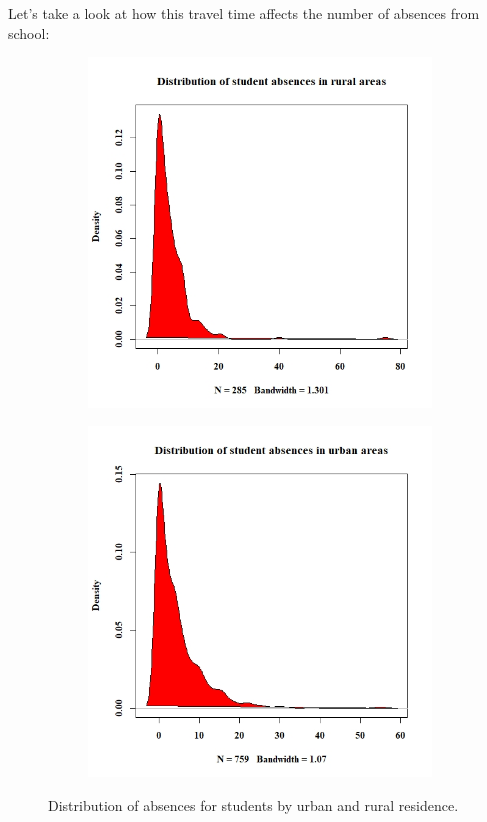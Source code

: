 \documentclass[a4paper, 11pt]{article}
\begin{document}
	Let's take a look at how this travel time affects the number of absences from school:
	\begin{figure}[H]
		\centering
		\begin{subfigure}[b]{0.4\linewidth}
			\includegraphics[width=\linewidth]{abs_rur.jpeg}
		\end{subfigure}
		\begin{subfigure}[b]{0.4\linewidth}
			\includegraphics[width=\linewidth]{abs_urb.jpeg}
		\end{subfigure}
		\caption*{Distribution of absences for students by urban and rural residence.}
		\label{fig:absences}
	\end{figure}
	
\end{document}
